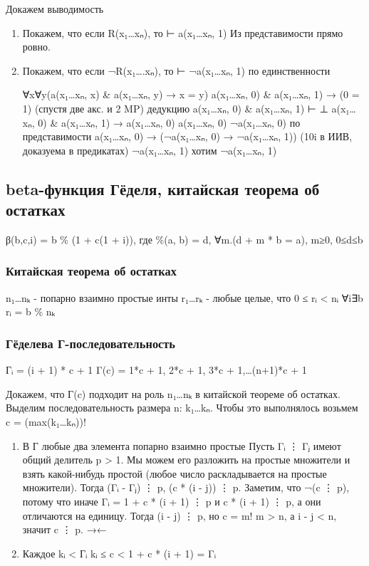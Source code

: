 \documentclass[11pt]{article}
\begin{document}
Докажем выводимость
\begin{enumerate}
\item Покажем, что если R(x₁\ldots{}xₙ), то ⊢ a(x₁\ldots{}xₙ, 1)
Из представимости прямо ровно.
\item Покажем, что если ¬R(x₁\ldots{}.xₙ), то ⊢ ¬a(x₁\ldots{}xₙ, 1)
по единственности

∀x∀y(a(x₁\ldots{}xₙ, x) \& a(x₁\ldots{}xₙ, y) → x = y)
a(x₁\ldots{}xₙ, 0) \& a(x₁\ldots{}xₙ, 1) → (0 = 1) (спустя две акс. и 2 MP)
дедукцию
a(x₁\ldots{}xₙ, 0) \& a(x₁\ldots{}xₙ, 1) ⊢ ⊥
a(x₁\ldots{}xₙ, 0) \& a(x₁\ldots{}xₙ, 1) → a(x₁\ldots{}xₙ, 0)
a(x₁\ldots{}xₙ, 0)
¬a(x₁\ldots{}xₙ, 0)                          по представимости
a(x₁\ldots{}xₙ, 0) → (¬a(x₁\ldots{}xₙ, 0) → ¬a(x₁\ldots{}xₙ, 1)) (10i в ИИВ, доказуема в предикатах)
¬a(x₁\ldots{}xₙ, 1)
хотим ¬a(x₁\ldots{}xₙ, 1)
\end{enumerate}
\subsection{beta-функция Гёделя, китайская теорема об остатках}
\label{sec-11-3}
β(b,c,i) = b \% (1 + c(1 + i)),
где \%(a, b) = d, ∀m.(d + m * b = a), m≥0, 0≤d≤b
\subsubsection{Китайская теорема об остатках}
\label{sec-11-3-1}
n₁\ldots{}nₖ - попарно взаимно простые инты
r₁\ldots{}rₖ - любые целые, что 0 ≤ rᵢ < nᵢ
∀i∃b  rᵢ = b \% nₖ
\subsubsection{Гёделева Г-последовательность}
\label{sec-11-3-2}
Гᵢ = (i + 1) * c + 1
Γ(c) = 1*c + 1, 2*c + 1, 3*c + 1,\ldots{}(n+1)*c + 1

Докажем, что Г(c) подходит на роль n₁\ldots{}nₖ в китайской
теореме об остатках. Выделим последовательность размера
n: k₁\ldots{}kₙ.
Чтобы это выполнялось возьмем c = (max(k₁\ldots{}kₙ))!
\begin{enumerate}
\item В Г любые два элемента попарно взаимно простые
\label{sec-11-3-2-1}
Пусть Γᵢ ⋮ Γⱼ имеют общий делитель p > 1. Мы можем его разложить
на простые множители и взять какой-нибудь простой (любое число
раскладывается на простые множители).
Тогда (Γᵢ - Γⱼ) ⋮ p, (c * (i - j)) ⋮ p. Заметим, что ¬(c ⋮ p),
потому что иначе Γᵢ = 1 + c * (i + 1) ⋮ p и c * (i + 1) ⋮ p,
а они отличаются на единицу. Тогда (i - j) ⋮ p, но c = m! m > n,
а i - j < n, значит c ⋮ p. →←
\item Каждое kᵢ < Гᵢ
\label{sec-11-3-2-2}
kᵢ ≤ c < 1 + c * (i + 1) = Γᵢ
\end{enumerate}
\end{document}

